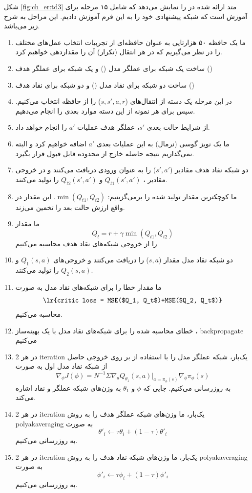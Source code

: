 شکل \ref{fig:ch_er:td3} متد ارائه شده در \cite{fujimoto2018addressing} را نمایش می‌دهد که شامل ۱۵ مرحله برای آموزش است که شبکه پیشنهادی خود را به این فرم آموزش دادیم. این مراحل به شرح زیر می‌باشد.
\begin{enumerate}
	\item
ما یک حافظه ۵۰ هزارتایی به عنوان حافظه‌ای از تجربیات انتخاب عمل‌های مختلف را در نظر می‌گیریم که در هر انتقال (تکرار) آن را مقداردهی خواهیم کرد.
\item
ساخت یک شبکه برای عملگر مدل () و یک شبکه برای عملگر هدف ()
\item
ساخت دو شبکه برای نقاد مدل () و دو شبکه برای نقاد هدف ()
	
\item
در این مرحله یک دسته از انتقال‌های ($s, s', a, r$) را از حافظه انتخاب می‌کنیم. سپس برای هر نمونه از این دسته موارد بعدی را انجام می‌دهیم.
\item
از شرایط حالت بعدی $s'$، عملگر هدف عملیات $a'$ را انجام خواهد داد.
\item
ما یک نویز گوسی (نرمال) به این عملیات بعدی $a'$ اضافه خواهیم کرد و البته نمی‌گذاریم نتیجه حاصله خارج از محدوده قابل قبول قرار بگیرد.
\item
دو شبکه نقاد هدف مقادیر ($s',a'$) را به عنوان ورودی دریافت می‌کنند و در خروجی مقادیر
 ، 
$Q_{t1}(s',a')$
 و
 $Q_{t2}(s',a')$
  را تولید می‌کنند.
\item
ما کوچکترین مقدار  تولید شده را برمی‌گزینیم: $\min(Q_{t1}, Q_{t2})$. این مقدار در واقع ارزش حالت بعد را تخمین می‌زند.
\item
ما مقدار
$$Q_t=r+\gamma\min(Q_{t1}, Q_{t2})$$
 را از خروجی شبکه‌های نقاد هدف محاسبه می‌کنیم
\item
دو شبکه نقاد مدل مقدار ($s,a$) را دریافت می‌کنند و خروجی‌های 
$Q_1(s,a)$ و $Q_2(s,a)$
 را تولید می‌کنند.
\item
ما مقدار خطا را برای شبکه‌های نقاد مدل به صورت
$$\text{\lr{critic loss = MSE($Q_1, Q_t$)+MSE($Q_2, Q_t$)}}$$
 محاسبه می‌کنیم.
\item
خطای محاسبه شده را برای شبکه‌های نقاد مدل با یک بهینه‌ساز ، \gls{backpropagate} می‌کنیم
\item
در هر 2 \gls{iteration} یک‌بار، شبکه عملگر مدل را با استفاده از  بر روی خروجی حاصل از شبکه نقاد مدل اول به صورت
$$\nabla_{\phi}J(\phi)=N^{-1}\Sigma\nabla_aQ_{\theta_1}(s,a)|_{a=\pi_\phi(s)}\nabla_\phi\pi_\phi(s)$$
به روزرسانی می‌کنیم. جایی که $\phi$ و $\theta_1$ به وزن‌های شبکه عملگر و نقاد اشاره می‌کند.
\item
در هر 2 \gls{iteration} یک‌بار، ما وزن‌های شبکه عملگر هدف را به روش \gls{polyakaveraging} به صورت 
$$\theta'_i \leftarrow \tau\theta_i+(1-\tau)\theta'_i$$
به روزرسانی می‌کنیم.
\item
در هر 2 \gls{iteration} یک‌بار، ما وزن‌های شبکه نقاد هدف را به روش \gls{polyakaveraging} به صورت 
$$\phi'_i \leftarrow \tau\phi_i+(1-\tau)\phi'_i$$
 به روزرسانی می‌کنیم.
\end{enumerate}


